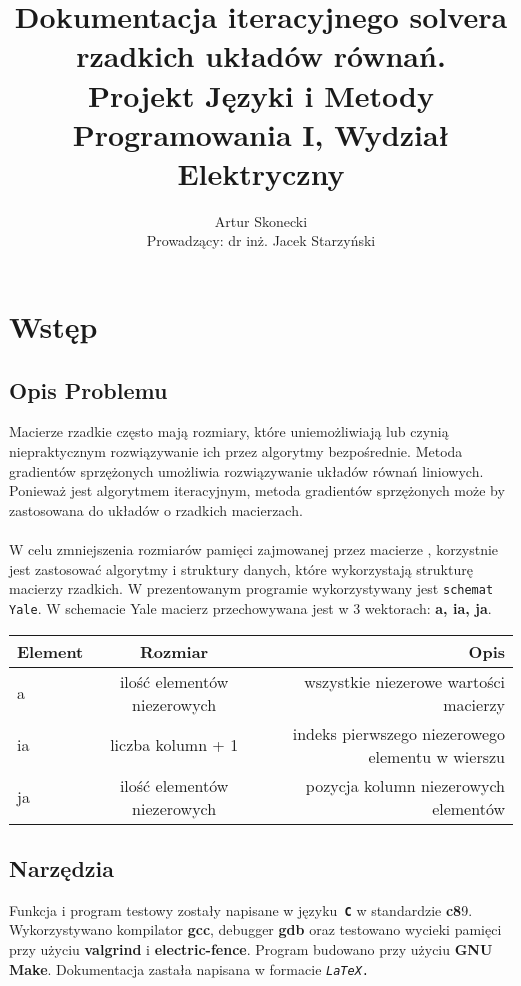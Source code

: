 \documentclass[bibtotocnumbered, headsepline,normalheadings,12pt,polish]{scrreprt}
\begin{document}
\title{\textbf{Dokumentacja iteracyjnego solvera rzadkich układów równań.}\\ \small{Projekt Języki i Metody Programowania I, Wydział Elektryczny}}
\author{Artur Skonecki \\ Prowadzący: dr inż. Jacek Starzyński}
\date{}
\maketitle


\tableofcontents

\chapter{Wstęp}
\section{Opis Problemu}
\normalsize
Macierze rzadkie często mają rozmiary, które uniemożliwiają lub czynią niepraktycznym rozwiązywanie ich przez algorytmy bezpośrednie. Metoda gradientów sprzężonych umożliwia rozwiązywanie układów równań liniowych. Ponieważ jest algorytmem iteracyjnym, metoda gradientów sprzężonych może by zastosowana do układów o rzadkich macierzach.
\\ \\
W celu zmniejszenia rozmiarów pamięci zajmowanej przez macierze , korzystnie jest zastosować algorytmy i struktury danych, które wykorzystają strukturę macierzy rzadkich. W prezentowanym programie wykorzystywany jest \texttt{schemat Yale}.
W schemacie Yale macierz przechowywana jest w 3 wektorach: \textbf{a, ia, ja}.\\

\normalsize
\begin{tabular}{| l || c | r |}
\hline
Element & Rozmiar & Opis \\
\hline
\hline
a  & ilość elementów niezerowych & wszystkie niezerowe wartości macierzy\\
\hline
ia & liczba kolumn + 1 & indeks pierwszego niezerowego elementu w wierszu\\
\hline
ja & ilość elementów niezerowych & pozycja kolumn niezerowych elementów\\
\hline
\end{tabular}

\section{Narzędzia}
\normalsize
Funkcja i program testowy zostały napisane w języku\texttt{ \textbf{C}} w standardzie \textbf{c8}9.
Wykorzystywano kompilator \textbf{gcc}, debugger \textbf{gdb} oraz testowano wycieki pamięci przy użyciu \textbf{valgrind} i \textbf{electric-fence}. Program budowano przy użyciu \textbf{GNU Make}. Dokumentacja zastała napisana w formacie \texttt{\textit{LaTeX}.}
\end{document}
